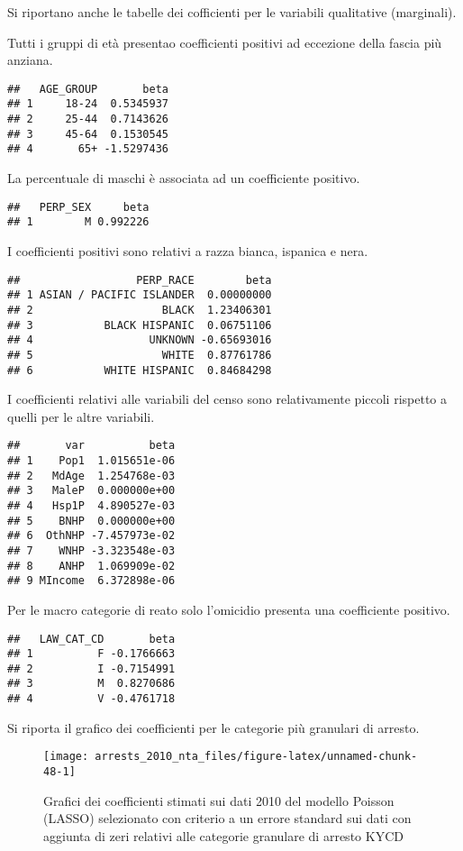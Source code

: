 \documentclass[
  ,
]{article}
\begin{document}
Si riportano anche le tabelle dei cofficienti per le variabili qualitative (marginali).

Tutti i gruppi di età presentao coefficienti positivi ad eccezione della fascia più anziana.

\begin{verbatim}
##   AGE_GROUP       beta
## 1     18-24  0.5345937
## 2     25-44  0.7143626
## 3     45-64  0.1530545
## 4       65+ -1.5297436
\end{verbatim}

La percentuale di maschi è associata ad un coefficiente positivo.

\begin{verbatim}
##   PERP_SEX     beta
## 1        M 0.992226
\end{verbatim}

I coefficienti positivi sono relativi a razza bianca, ispanica e nera.

\begin{verbatim}
##                  PERP_RACE        beta
## 1 ASIAN / PACIFIC ISLANDER  0.00000000
## 2                    BLACK  1.23406301
## 3           BLACK HISPANIC  0.06751106
## 4                  UNKNOWN -0.65693016
## 5                    WHITE  0.87761786
## 6           WHITE HISPANIC  0.84684298
\end{verbatim}

I coefficienti relativi alle variabili del censo sono relativamente piccoli rispetto a quelli per le altre variabili.

\begin{verbatim}
##       var          beta
## 1    Pop1  1.015651e-06
## 2   MdAge  1.254768e-03
## 3   MaleP  0.000000e+00
## 4   Hsp1P  4.890527e-03
## 5    BNHP  0.000000e+00
## 6  OthNHP -7.457973e-02
## 7    WNHP -3.323548e-03
## 8    ANHP  1.069909e-02
## 9 MIncome  6.372898e-06
\end{verbatim}

Per le macro categorie di reato solo l'omicidio presenta una coefficiente positivo.

\begin{verbatim}
##   LAW_CAT_CD       beta
## 1          F -0.1766663
## 2          I -0.7154991
## 3          M  0.8270686
## 4          V -0.4761718
\end{verbatim}

Si riporta il grafico dei coefficienti per le categorie più granulari di arresto.

\begin{figure}

{\centering \texttt{[image: arrests\_2010\_nta\_files/figure-latex/unnamed-chunk-48-1]} 

}

\caption{Grafici dei coefficienti stimati sui dati 2010 del modello Poisson (LASSO) selezionato con criterio a un errore standard sui dati con aggiunta di zeri relativi alle categorie granulare di arresto KYCD}\label{fig:unnamed-chunk-48}
\end{figure}
\end{document}
